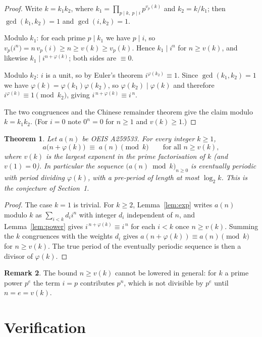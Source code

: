 \documentclass[11pt,a4paper]{article}
\theoremstyle{plain}
\newtheorem{theorem}{Theorem}
\theoremstyle{definition}
\newtheorem{remark}[theorem]{Remark}
\begin{document}
\begin{proof}
Write $k=k_1k_2$, where $k_1=\prod_{p\mid k,\ p\mid i}p^{v_p(k)}$ and $k_2=k/k_1$; then
$\gcd(k_1,k_2)=1$ and $\gcd(i,k_2)=1$.

Modulo $k_1$: for each prime $p\mid k_1$ we have $p\mid i$, so
$v_p\bigl(i^{n}\bigr)=n\,v_p(i)\ge n\ge v(k)\ge v_p(k)$. Hence $k_1\mid i^{n}$ for
$n\ge v(k)$, and likewise $k_1\mid i^{n+\varphi(k)}$; both sides are $\equiv 0$.

Modulo $k_2$: $i$ is a unit, so by Euler's theorem $i^{\varphi(k_2)}\equiv 1$. Since
$\gcd(k_1,k_2)=1$ we have $\varphi(k)=\varphi(k_1)\varphi(k_2)$, so
$\varphi(k_2)\mid\varphi(k)$ and therefore $i^{\varphi(k)}\equiv 1 \pmod{k_2}$, giving
$i^{\,n+\varphi(k)}\equiv i^{\,n}$.

The two congruences and the Chinese remainder theorem give the claim modulo $k=k_1k_2$.
(For $i=0$ note $0^{n}=0$ for $n\ge 1$ and $v(k)\ge1$.)
\end{proof}

\begin{theorem}\label{thm:main}
Let $a(n)$ be OEIS A259533. For every integer $k\ge1$,
\[
a\bigl(n+\varphi(k)\bigr)\;\equiv\;a(n)\pmod{k}\qquad\text{for all } n\ge v(k),
\]
where $v(k)$ is the largest exponent in the prime factorisation of $k$ (and $v(1)=0$).
In particular the sequence $\bigl(a(n)\bmod k\bigr)_{n\ge0}$ is eventually periodic with
period dividing $\varphi(k)$, with a pre-period of length at most $\log_2 k$. This is the
conjecture of Section~1.
\end{theorem}

\begin{proof}
The case $k=1$ is trivial. For $k\ge2$, Lemma~\ref{lem:exp} writes $a(n)$ modulo $k$ as
$\sum_{i<k}d_i i^{n}$ with integer $d_i$ independent of $n$, and Lemma~\ref{lem:power}
gives $i^{\,n+\varphi(k)}\equiv i^{\,n}$ for each $i<k$ once $n\ge v(k)$. Summing the
$k$ congruences with the weights $d_i$ gives
$a(n+\varphi(k))\equiv a(n)\pmod k$ for $n\ge v(k)$. The true period of the eventually
periodic sequence is then a divisor of $\varphi(k)$.
\end{proof}

\begin{remark}
The bound $n\ge v(k)$ cannot be lowered in general: for $k$ a prime power $p^{e}$ the
term $i=p$ contributes $p^{n}$, which is not divisible by $p^{e}$ until $n=e=v(k)$.
\end{remark}

\section{Verification}
\end{document}
